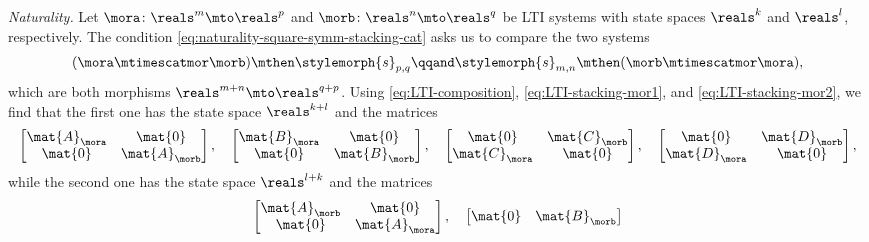\begin{example}
    \emph{Naturality.}
    Let $\mora \colon \reals^m \mto \reals^p$ and $\morb \colon \reals^n \mto \reals^q$ be LTI systems with state spaces $\reals^k$ and $\reals^l$, respectively.
    The condition \cref{eq:naturality-square-symm-stacking-cat} asks us to compare the two systems
    \begin{equation}
        \label{eq:LTI-swap-naturality-two-sides}
        (\mora \mtimescatmor \morb) \mthen \stylemorph{s}_{p,q}
        \qqand
        \stylemorph{s}_{m,n} \mthen (\morb \mtimescatmor \mora),
    \end{equation}
    which are both morphisms $\reals^{m+n} \mto \reals^{q+p}$.
    Using \cref{eq:LTI-composition}, \cref{eq:LTI-stacking-mor1}, and \cref{eq:LTI-stacking-mor2}, we find that the first one has the state space $\reals^{k+l}$ and the matrices
    \begin{equation}
        \label{eq:LTI-swap-naturality-first}
        \begin{bmatrix}
            \mat{A}_\mora & \mat{0}       \\
            \mat{0}       & \mat{A}_\morb
        \end{bmatrix},
        \quad
        \begin{bmatrix}
            \mat{B}_\mora & \mat{0}       \\
            \mat{0}       & \mat{B}_\morb
        \end{bmatrix},
        \quad
        \begin{bmatrix}
            \mat{0}       & \mat{C}_\morb \\
            \mat{C}_\mora & \mat{0}
        \end{bmatrix},
        \quad
        \begin{bmatrix}
            \mat{0}       & \mat{D}_\morb \\
            \mat{D}_\mora & \mat{0}
        \end{bmatrix},
    \end{equation}
    while the second one has the state space $\reals^{l+k}$ and the matrices
    \begin{equation}
        \label{eq:LTI-swap-naturality-second}
        \begin{bmatrix}
            \mat{A}_\morb & \mat{0}       \\
            \mat{0}       & \mat{A}_\mora
        \end{bmatrix},
        \quad
        \begin{bmatrix}
            \mat{0}       & \mat{B}_\morb \\

\end{bmatrix}
\end{equation}
\end{example}
